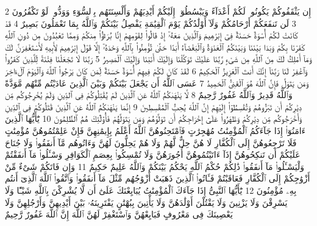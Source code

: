 {\tiny\colorbox{cl_aya}{2}} إِن يَثْقَفُوكُمْ يَكُونُوا۟ لَكُمْ أَعْدَآءً وَيَبْسُطُوٓا۟ إِلَيْكُمْ أَيْدِيَهُمْ وَأَلْسِنَتَهُم بِٱلسُّوٓءِ وَوَدُّوا۟ لَوْ تَكْفُرُونَ
{\tiny\colorbox{cl_aya}{3}} لَن تَنفَعَكُمْ أَرْحَامُكُمْ وَلَآ أَوْلَٰدُكُمْ يَوْمَ ٱلْقِيَٰمَةِ يَفْصِلُ بَيْنَكُمْ وَٱللَّهُ بِمَا تَعْمَلُونَ بَصِيرٌ
{\tiny\colorbox{cl_aya}{4}} قَدْ كَانَتْ لَكُمْ أُسْوَةٌ حَسَنَةٌ فِىٓ إِبْرَٰهِيمَ وَٱلَّذِينَ مَعَهُۥٓ إِذْ قَالُوا۟ لِقَوْمِهِمْ إِنَّا بُرَءَٰٓؤُا۟ مِنكُمْ وَمِمَّا تَعْبُدُونَ مِن دُونِ ٱللَّهِ كَفَرْنَا بِكُمْ وَبَدَا بَيْنَنَا وَبَيْنَكُمُ ٱلْعَدَٰوَةُ وَٱلْبَغْضَآءُ أَبَدًا حَتَّىٰ تُؤْمِنُوا۟ بِٱللَّهِ وَحْدَهُۥٓ إِلَّا قَوْلَ إِبْرَٰهِيمَ لِأَبِيهِ لَأَسْتَغْفِرَنَّ لَكَ وَمَآ أَمْلِكُ لَكَ مِنَ ٱللَّهِ مِن شَىْءٍ رَّبَّنَا عَلَيْكَ تَوَكَّلْنَا وَإِلَيْكَ أَنَبْنَا وَإِلَيْكَ ٱلْمَصِيرُ
{\tiny\colorbox{cl_aya}{5}} رَبَّنَا لَا تَجْعَلْنَا فِتْنَةً لِّلَّذِينَ كَفَرُوا۟ وَٱغْفِرْ لَنَا رَبَّنَآ إِنَّكَ أَنتَ ٱلْعَزِيزُ ٱلْحَكِيمُ
{\tiny\colorbox{cl_aya}{6}} لَقَدْ كَانَ لَكُمْ فِيهِمْ أُسْوَةٌ حَسَنَةٌ لِّمَن كَانَ يَرْجُوا۟ ٱللَّهَ وَٱلْيَوْمَ ٱلْءَاخِرَ وَمَن يَتَوَلَّ فَإِنَّ ٱللَّهَ هُوَ ٱلْغَنِىُّ ٱلْحَمِيدُ
{\tiny\colorbox{cl_aya}{7}} عَسَى ٱللَّهُ أَن يَجْعَلَ بَيْنَكُمْ وَبَيْنَ ٱلَّذِينَ عَادَيْتُم مِّنْهُم مَّوَدَّةً وَٱللَّهُ قَدِيرٌ وَٱللَّهُ غَفُورٌ رَّحِيمٌ
{\tiny\colorbox{cl_aya}{8}} لَّا يَنْهَىٰكُمُ ٱللَّهُ عَنِ ٱلَّذِينَ لَمْ يُقَٰتِلُوكُمْ فِى ٱلدِّينِ وَلَمْ يُخْرِجُوكُم مِّن دِيَٰرِكُمْ أَن تَبَرُّوهُمْ وَتُقْسِطُوٓا۟ إِلَيْهِمْ إِنَّ ٱللَّهَ يُحِبُّ ٱلْمُقْسِطِينَ
{\tiny\colorbox{cl_aya}{9}} إِنَّمَا يَنْهَىٰكُمُ ٱللَّهُ عَنِ ٱلَّذِينَ قَٰتَلُوكُمْ فِى ٱلدِّينِ وَأَخْرَجُوكُم مِّن دِيَٰرِكُمْ وَظَٰهَرُوا۟ عَلَىٰٓ إِخْرَاجِكُمْ أَن تَوَلَّوْهُمْ وَمَن يَتَوَلَّهُمْ فَأُو۟لَٰٓئِكَ هُمُ ٱلظَّٰلِمُونَ
{\tiny\colorbox{cl_aya}{10}} يَٰٓأَيُّهَا ٱلَّذِينَ ءَامَنُوٓا۟ إِذَا جَآءَكُمُ ٱلْمُؤْمِنَٰتُ مُهَٰجِرَٰتٍ فَٱمْتَحِنُوهُنَّ ٱللَّهُ أَعْلَمُ بِإِيمَٰنِهِنَّ فَإِنْ عَلِمْتُمُوهُنَّ مُؤْمِنَٰتٍ فَلَا تَرْجِعُوهُنَّ إِلَى ٱلْكُفَّارِ لَا هُنَّ حِلٌّ لَّهُمْ وَلَا هُمْ يَحِلُّونَ لَهُنَّ وَءَاتُوهُم مَّآ أَنفَقُوا۟ وَلَا جُنَاحَ عَلَيْكُمْ أَن تَنكِحُوهُنَّ إِذَآ ءَاتَيْتُمُوهُنَّ أُجُورَهُنَّ وَلَا تُمْسِكُوا۟ بِعِصَمِ ٱلْكَوَافِرِ وَسْـَٔلُوا۟ مَآ أَنفَقْتُمْ وَلْيَسْـَٔلُوا۟ مَآ أَنفَقُوا۟ ذَٰلِكُمْ حُكْمُ ٱللَّهِ يَحْكُمُ بَيْنَكُمْ وَٱللَّهُ عَلِيمٌ حَكِيمٌ
{\tiny\colorbox{cl_aya}{11}} وَإِن فَاتَكُمْ شَىْءٌ مِّنْ أَزْوَٰجِكُمْ إِلَى ٱلْكُفَّارِ فَعَاقَبْتُمْ فَـَٔاتُوا۟ ٱلَّذِينَ ذَهَبَتْ أَزْوَٰجُهُم مِّثْلَ مَآ أَنفَقُوا۟ وَٱتَّقُوا۟ ٱللَّهَ ٱلَّذِىٓ أَنتُم بِهِۦ مُؤْمِنُونَ
{\tiny\colorbox{cl_aya}{12}} يَٰٓأَيُّهَا ٱلنَّبِىُّ إِذَا جَآءَكَ ٱلْمُؤْمِنَٰتُ يُبَايِعْنَكَ عَلَىٰٓ أَن لَّا يُشْرِكْنَ بِٱللَّهِ شَيْـًٔا وَلَا يَسْرِقْنَ وَلَا يَزْنِينَ وَلَا يَقْتُلْنَ أَوْلَٰدَهُنَّ وَلَا يَأْتِينَ بِبُهْتَٰنٍ يَفْتَرِينَهُۥ بَيْنَ أَيْدِيهِنَّ وَأَرْجُلِهِنَّ وَلَا يَعْصِينَكَ فِى مَعْرُوفٍ فَبَايِعْهُنَّ وَٱسْتَغْفِرْ لَهُنَّ ٱللَّهَ إِنَّ ٱللَّهَ غَفُورٌ رَّحِيمٌ
